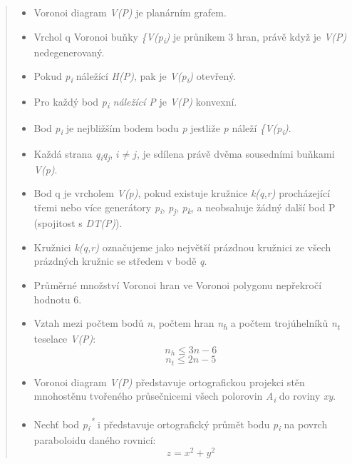 \begin{quote}
\begin{itemize}

\item Voronoi diagram \textit{V(P)} je planárním grafem.
\item Vrchol q Voronoi buňky \textit{\{V(p\textsubscript{i})} je průnikem 3 hran, právě když je \textit{V(P)} nedegenerovaný.
\item Pokud \textit{p\textsubscript{i}} náležící \textit{H(P)}, pak je \textit{V(p\textsubscript{i})}  otevřený. 
\item Pro každý bod \textit{p\textsubscript{i} náležící P} je \textit{V(P)} konvexní. 
\item Bod \textit{p\textsubscript{i}} je nejbližším bodem bodu \textit{p}
jestliže \textit{p} náleží \textit{\{V(p\textsubscript{i})}.
\item Každá strana \textit{q\textsubscript{i}q\textsubscript{j}}, \(i \neq j\),
je sdílena právě dvěma sousedními buňkami \textit{V(p)}. 
\item Bod q je vrcholem \textit{V(p)}, pokud existuje kružnice \textit{k(q,r)} procházející třemi
nebo více generátory \textit{p\textsubscript{i}}, \textit{p\textsubscript{j}},
\textit{p\textsubscript{k}}, a neobsahuje žádný další bod P (spojitost s \textit{DT(P)}). 
\item Kružnici \textit{k(q,r)} označujeme jako největší prázdnou kružnici ze všech prázdných kružnic se středem v bodě \textit{q}. 
\item Průměrné množství Voronoi hran ve Voronoi polygonu nepřekročí hodnotu 6. 
\item Vztah mezi počtem bodů \textit{n}, počtem hran \textit{n\textsubscript{h}}
a počtem trojúhelníků \textit{n\textsubscript{t}} teselace \textit{V(P)}:
\[ n_h \leq 3n-6\]
\[ n_t \leq 2n−5\]
\item Voronoi diagram \textit{V(P)} představuje ortografickou projekci stěn
mnohostěnu tvořeného průsečnicemi všech polorovin \textit{A\textsubscript{i}} do roviny \textit{xy}. 
\item Nechť bod \textit{p\textsubscript{i}\textsuperscript{*}} i představuje
ortografický průmět bodu \textit{p\textsubscript{i}} na povrch paraboloidu daného rovnicí:
\[ z = x^2 + y^2 \]
   
\end{itemize}
\end{quote}

